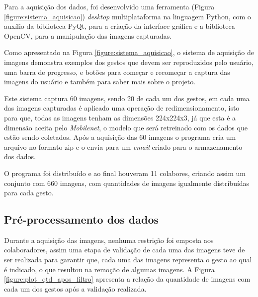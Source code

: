 \par Para a aquisição dos dados, foi desenvolvido uma ferramenta (Figura \ref{figure:sistema_aquisicao}) \textit{desktop} multiplataforma na linguagem Python, com o auxílio da biblioteca PyQt, para a criação da interface gráfica e a biblioteca OpenCV, para a manipulação das imagens capturadas.


\par Como apresentado na Figura \ref{figure:sistema_aquisicao}, o sistema de aquisição de imagens demonstra exemplos dos gestos que devem ser reproduzidos pelo usuário, uma barra de progresso, e botões para começar e recomeçar a captura das imagens do usuário e também para saber mais sobre o projeto.

\par Este sistema captura 60 imagens, sendo 20 de cada um dos gestos, em cada uma das imagens capturadas é aplicado uma operação de redimensionamento, isto para que, todas as imagens tenham as dimensões 224x224x3, já que esta é a dimensão aceita pelo \textit{Mobilenet}, o modelo que será retreinado com os dados que estão sendo coletados. Após a aquisição das 60 imagens o programa cria um arquivo no formato zip e o envia para um \textit{email} criado para o armazenamento dos dados.

\par O programa foi distribuído e ao final houveram 11 colabores, criando assim um conjunto com 660 imagens, com quantidades de imagens igualmente distribuídas para cada gesto.

\subsection{Pré-processamento dos dados} 

\par Durante a aquisição das imagens, nenhuma restrição foi emposta aos colaboradores, assim uma etapa de validação de cada uma das imagens teve de ser realizada para garantir que, cada uma das imagens representa o gesto ao qual é indicado, o que resultou na remoção de algumas imagens. A Figura \ref{figure:plot_qtd_apos_filtro} apresenta a relação da quantidade de imagens com cada um dos gestos após a validação realizada.

